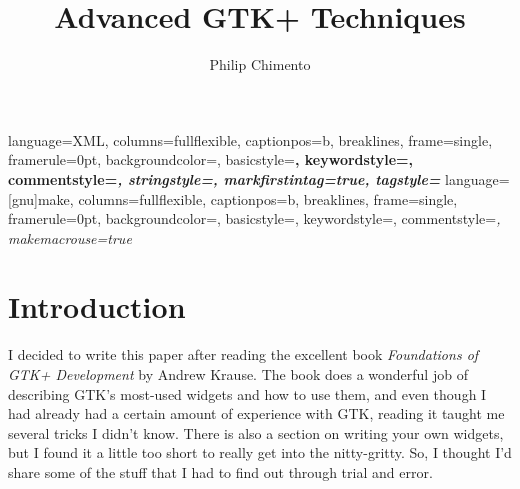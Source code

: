 \documentclass[%
			   halfparskip,smallheadings,pointlessnumbers]%
			   {scrartcl} %
\begin{document}
%
	{language=XML, columns=fullflexible, captionpos=b, breaklines,%
	frame=single, framerule=0pt, backgroundcolor=\color{LightGray},%
	basicstyle=\rmfamily\bfseries\small,%
	keywordstyle=\ttfamily\mdseries\color{MidnightBlue},%
	commentstyle=\rmfamily\mdseries\itshape\color{PineGreen},%
	stringstyle=\rmfamily\bfseries\color{RoyalBlue},
	markfirstintag=true, tagstyle=\ttfamily\mdseries\color{Maroon}%
	}
%
	{language=[gnu]make, columns=fullflexible, captionpos=b, breaklines,%
	frame=single, framerule=0pt, backgroundcolor=\color{LightGray},%
	basicstyle=\ttfamily\small,%
	keywordstyle=\color{MidnightBlue},%
	commentstyle=\rmfamily\itshape\color{PineGreen},%
	makemacrouse=true%
	}

\title{Advanced GTK+ Techniques}
\author{Philip Chimento}
\maketitle

\section{Introduction}
I decided to write this paper after reading the excellent book \emph{Foundations of GTK+ Development} by Andrew Krause. The book does a wonderful job of describing GTK's most-used widgets and how to use them, and even though I had already had a certain amount of experience with GTK, reading it taught me several tricks I didn't know. There is also a section on writing your own widgets, but I found it a little too short to really get into the nitty-gritty. So, I thought I'd share some of the stuff that I had to find out through trial and error.
\end{document}

